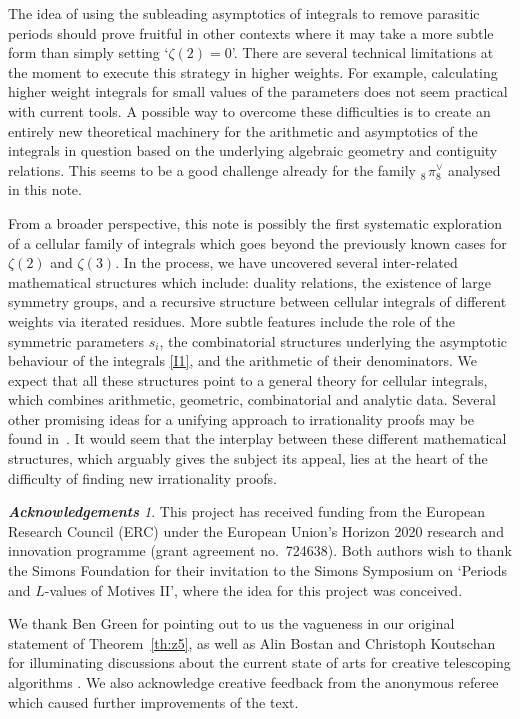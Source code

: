 \documentclass[12pt,reqno]{amsart}
\theoremstyle{remark}
\newtheorem*{acknowledgements}{\bf Acknowledgements}
\begin{document}
The idea of using the subleading asymptotics of integrals to remove parasitic periods should prove  fruitful in other contexts where it may  take a more subtle form than simply setting `$\zeta(2)=0$'. 
There are several technical limitations at the moment to execute this strategy in higher weights.
For example, calculating higher weight integrals for small values of the parameters does not seem practical with current tools.
A possible way to overcome these difficulties is to create an entirely new  theoretical machinery for the arithmetic and asymptotics of the integrals in question based on the underlying algebraic geometry and contiguity relations. 
This seems to be a good challenge already for the family ${}^{\phantom\vee}_8\!\pi^\vee_8$ analysed in this note.

From a broader perspective,   this note is possibly the first systematic exploration of a cellular family of integrals which goes beyond the previously known cases for $\zeta(2)$ and $\zeta(3)$. In the process, we have uncovered several inter-related mathematical structures which include:  duality relations, the existence of large symmetry groups, and a recursive  structure  between cellular integrals  of different weights via iterated residues. 
More subtle features include the role of the symmetric parameters $s_i$, the combinatorial structures underlying the asymptotic behaviour of the integrals \eqref{I1}, and  the arithmetic of their denominators.  We expect that all these  structures point to a general theory for  cellular integrals, which   combines arithmetic, geometric, combinatorial and analytic data. Several other promising ideas for a unifying approach to irrationality proofs may  be found in~\cite{Du18, Ke20}. 
It would seem that the interplay between these different  mathematical structures, which arguably gives the subject its appeal,  lies   at the heart of the   difficulty of finding new irrationality proofs. 

\begin{acknowledgements}
This project has received funding from the European Research Council (ERC) under the European Union's Horizon 2020 research and innovation programme (grant agreement no.~724638). Both authors wish to thank the Simons Foundation for their  invitation  to the Simons Symposium on `Periods and $L$-values of Motives II',  where the idea for this  project was conceived.

We thank Ben Green for pointing out to us the vagueness in our original statement of Theorem~\ref{th:z5}, as well as Alin Bostan and Christoph Koutschan for illuminating discussions about the current state of arts for creative telescoping algorithms \cite{WZ92,Ze91}.
We also acknowledge creative feedback from the anonymous referee which caused further improvements of the text.
\end{acknowledgements}
\end{document}
